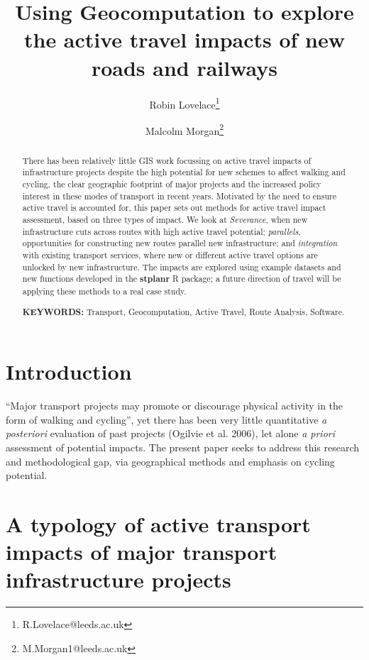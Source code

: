 \documentclass[11pt]{article}
\title{Using Geocomputation to explore the active travel impacts of new roads and railways}
\author[1]{Robin Lovelace\thanks{R.Lovelace@leeds.ac.uk}}
\author[1]{Malcolm Morgan\thanks{M.Morgan1@leeds.ac.uk}}
\affil[1]{Institute for Transport Studies, University or Leeds}
\begin{document}
\date{}
\maketitle


\begin{abstract}
\centering


There has been relatively little GIS work focussing
on active travel impacts of infrastructure projects despite the high potential for new
schemes to affect walking and cycling, the clear geographic footprint of major projects and the increased policy interest
in these modes of transport in recent years. Motivated by the need to
ensure active travel is accounted for, this paper sets out methods for
active travel impact assessment, based on three types of impact.
We look at \emph{Severance}, when new infrastructure cuts across routes with high
active travel potential; \emph{parallels}, opportunities for
constructing new routes parallel new infrastructure; and
\emph{integration} with existing transport services, where new or
different active travel options are unlocked by new infrastructure.
The impacts are explored using example datasets and new functions developed in the
\textbf{stplanr} R package; a future direction of travel
will be applying these methods to a real case study.

$ $ \\ {\bf KEYWORDS:} Transport, Geocomputation, Active Travel, Route Analysis, Software.

\end{abstract}

\section{Introduction}

``Major transport projects may promote or discourage physical activity
in the form of walking and cycling'', yet there has been very little
quantitative \emph{a posteriori} evaluation of past projects (Ogilvie et
al. 2006), let alone \emph{a priori} assessment of potential impacts.
The present paper seeks to address this research and methodological gap,
via geographical methods and emphasis on cycling potential.

\section{A typology of active transport impacts of major transport
infrastructure
projects}\label{a-typology-of-active-transport-impacts-of-major-transport-infrastructure-projects}
\end{document}
